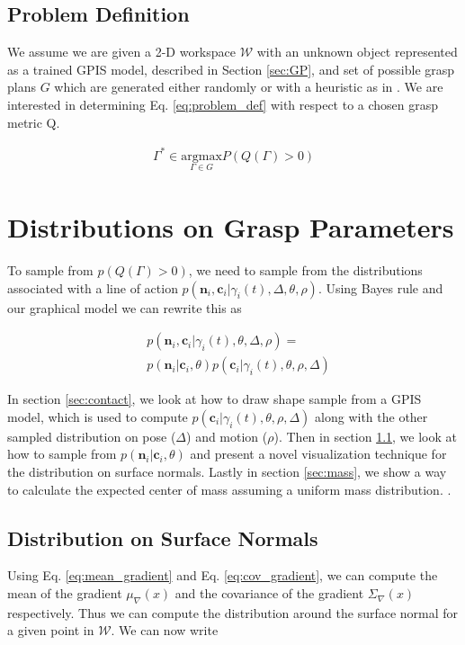\documentclass[letterpaper, 10 pt, conference]{ieeeconf}  %
\begin{document}
\subsection{Problem Definition}

We assume we are given a 2-D workspace $\mathcal{W}$ with an unknown object represented as a trained GPIS model, described in Section \ref{sec:GP}, and set of possible grasp plans $G$ which are generated either randomly or with a heuristic as in \cite{mahler2015gp}.
We are interested in determining Eq. \ref{eq:problem_def} with respect to a chosen grasp metric Q. 

\vspace{-2ex}
\begin{align}\label{eq:problem_def}
\Gamma^* \in \underset{\Gamma \in G}{\mbox{argmax}} P(Q(\Gamma)>0)
\end{align}

\section{Distributions on Grasp Parameters}
\label{sec:distgrasp}
 
 To sample from $p(Q(\Gamma)>0)$, we need to sample from the distributions associated with a line of action $p(\textbf{n}_i,\textbf{c}_i|\gamma_i(t),\Delta,\theta, \rho)$. Using Bayes rule and our graphical model we can rewrite this as 
 
 \vspace{-2ex}
 \begin{align*}
 &p(\textbf{n}_i,\textbf{c}_i |\gamma_i(t),\theta,\Delta,\rho)=\\
 &p(\textbf{n}_i|\textbf{c}_i,\theta)p(\textbf{c}_i|\gamma_i(t),\theta,\rho,\Delta)
 \end{align*}
 
 In section \ref{sec:contact}, we look at how to draw shape sample from a GPIS model, which is used to compute $p(\textbf{c}_i|\gamma_i(t),\theta,\rho,\Delta)$ along with the other sampled distribution on pose ($\Delta$) and motion ($\rho$). Then in section \ref{sec:normals}, we look at how to sample from $p(\textbf{n}_i|\textbf{c}_i,\theta)$ and present a novel visualization technique for the distribution on surface normals. Lastly in section \ref{sec:mass}, we show a way to calculate the expected center of mass assuming a uniform mass distribution. 
 .
\subsection{Distribution on Surface Normals}\label{sec:normals} 
Using Eq. \ref{eq:mean_gradient} and Eq. \ref{eq:cov_gradient}, we can compute the mean of the gradient $ \mu_{\nabla}(x)$ and the covariance of the gradient $\Sigma_{\nabla}(x)$ respectively. Thus we can compute the distribution around the surface normal for a given point in $\mathcal{W}$. We can now write 
\end{document}
